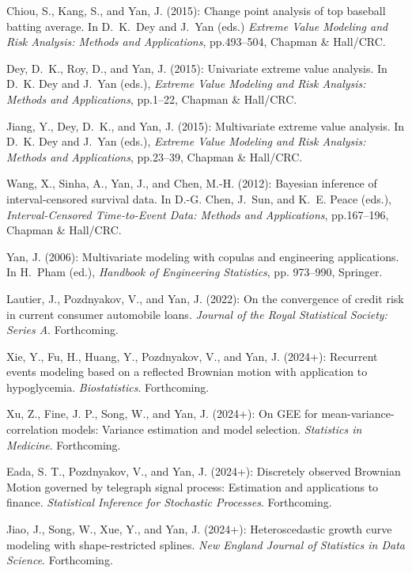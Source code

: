 \documentclass[Statistics]{vita}
\begin{document}
\begin{vita}
\begin{Publications}
\begin{BookChapters}
  \item *Chiou, S., Kang, S., and Yan, J. (2015): Change point analysis of top baseball batting average. In D.~K.~Dey and J.~Yan (eds.) {\em Extreme Value Modeling and Risk Analysis: Methods and Applications\/}, pp.493--504, Chapman \& Hall/CRC.
  \item Dey, D.~K., Roy, D., and Yan, J. (2015): Univariate extreme value analysis. In D.~K. Dey and J.~Yan (eds.), {\em Extreme Value Modeling and Risk Analysis: Methods and Applications\/}, pp.1--22, Chapman \& Hall/CRC.
  \item *Jiang, Y., Dey, D.~K., and Yan, J. (2015): Multivariate extreme value analysis. In D.~K. Dey and J.~Yan (eds.), {\em Extreme Value Modeling and Risk Analysis: Methods and Applications\/}, pp.23--39, Chapman \& Hall/CRC.
  \item *Wang, X., Sinha, A., Yan, J., and Chen, M.-H. (2012): Bayesian inference of interval-censored survival data. In D.-G. Chen, J.~Sun, and  K.~E. Peace (eds.), {\em Interval-Censored Time-to-Event Data: {M}ethods and Applications\/}, pp.167--196, Chapman \& Hall/CRC.
  \item Yan, J. (2006): Multivariate modeling with copulas and engineering applications. In H.~Pham (ed.), {\em Handbook of Engineering Statistics\/}, pp. 973--990, Springer.
  \end{BookChapters}
  \begin{RefereedJournalArticles}
  \item *Lautier, J., Pozdnyakov, V., and Yan, J. (2022): On the convergence of credit risk in current consumer automobile loans. {\em Journal of the Royal Statistical Society: Series A\/}. Forthcoming.
  \item *Xie, Y., Fu, H., Huang, Y., Pozdnyakov, V., and Yan, J. (2024+): Recurrent events modeling based on a reflected Brownian motion with application to hypoglycemia. {\em Biostatistics\/}. Forthcoming.
  \item *Xu, Z., Fine, J. P., Song, W., and Yan, J. (2024+): On GEE for mean-variance-correlation models: Variance estimation and model selection. {\em Statistics in Medicine\/}. Forthcoming.
  \item *Eada, S. T., Pozdnyakov, V., and Yan, J. (2024+): Discretely observed Brownian Motion governed by telegraph signal process: Estimation and applications to finance. {\em Statistical Inference for Stochastic Processes\/}. Forthcoming.
  \item *Jiao, J., Song, W., Xue, Y., and Yan, J. (2024+): Heteroscedastic growth curve modeling with shape-restricted splines. {\em New England Journal of Statistics in Data Science\/}. Forthcoming.

\end{RefereedJournalArticles}
\end{Publications}
\end{vita}
\end{document}
